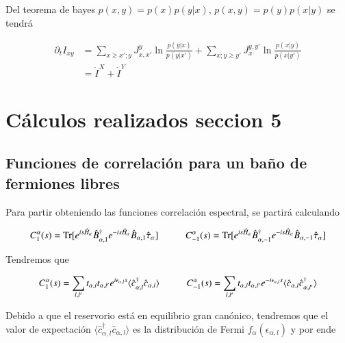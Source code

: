 \begin{appendixs}
Del teorema de bayes $p(x,y) = p(x)p(y|x)$, $p(x,y) = p(y)p(x|y)$ se tendrá

\begin{align*}
    \partial_{t}I_{xy} & = \sum_{x \geq x';y} J_{x,x'}^{y} \ln \frac{p(y|x) }{p(y|x')} + \sum_{x;y\geq y'} J_{x}^{y,y'} \ln \frac{p(x|y) }{p(x|y')} \\
                       & = \dot{I}^{X} + \dot{I}^{Y} 
\end{align*}

    \label{apendix4:secondlaw}


\newpage

\section{Cálculos realizados seccion 5}
\subsection{Funciones de correlación para un baño de fermiones libres}
Para partir obteniendo las funciones correlación espectral, se partirá calculando

\begin{equation*}
    C_{1}^{\alpha}(s) = \text{Tr}[e^{is\hat{H}_{\alpha}}\hat{B}^{\dagger}_{\alpha,1}e^{-is\hat{H}_{\alpha}}\hat{B}_{\alpha,1}\hat{\tau}_{\alpha}  ]  \hspace{10mm} C_{-1}^{\alpha}(s) = \text{Tr}[e^{is\hat{H}_{\alpha}}\hat{B}^{\dagger}_{\alpha,-1}e^{-is\hat{H}_{\alpha}}\hat{B}_{\alpha,-1}\hat{\tau}_{\alpha}  ] 
\end{equation*}

Tendremos que

\begin{equation*}
    C_{1}^{\alpha}(s) = \sum_{l,l'}t_{\alpha,l}t_{\alpha,l'}e^{i\epsilon_{\alpha,l}s} \langle \hat{c}^{\dagger}_{\alpha,l}\hat{c}_{\alpha,l} \rangle \hspace{10mm} C
    ^{\alpha}_{-1}(s) = \sum_{l,l'}t_{\alpha,l}t_{\alpha,l'}e^{-i\epsilon_{\alpha,l}s} \langle \hat{c}_{\alpha,l}\hat{c}^{\dagger}_{\alpha,l'} \rangle
\end{equation*}

Debido a que el reservorio está en equilibrio gran canónico, tendremos que el valor de expectación $\langle \hat{c}^{\dagger}_{\alpha,l}\hat{c}_{\alpha,l}\rangle$ es la distribución de Fermi $f_{\alpha}(\epsilon_{\alpha,l})$ y por ende  


\end{appendixs}
